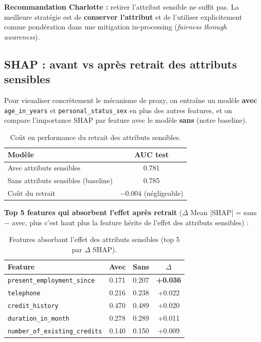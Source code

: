 \documentclass[11pt, a4paper]{article}
\begin{document}
\noindent\textbf{Recommandation Charlotte :} retirer l'attribut sensible ne suffit pas. La meilleure strat\'{e}gie est de \textbf{conserver l'attribut} et de l'utiliser explicitement comme pond\'{e}ration dans une mitigation in-processing (\textit{fairness through awareness}).

\subsection{SHAP : avant vs apr\`{e}s retrait des attributs sensibles}

Pour visualiser concr\`{e}tement le m\'{e}canisme de proxy, on entra\^{i}ne un mod\`{e}le \textbf{avec} \texttt{age\_in\_years} et \texttt{personal\_status\_sex} en plus des autres features, et on compare l'importance SHAP par feature avec le mod\`{e}le \textbf{sans} (notre baseline).

\begin{table}[H]
\centering
\begin{tabular}{lc}
\toprule
\textbf{Mod\`{e}le} & \textbf{AUC test} \\
\midrule
Avec attributs sensibles & 0.781 \\
Sans attributs sensibles (baseline) & 0.785 \\
\midrule
Co\^{u}t du retrait & $-0.004$ (n\'{e}gligeable) \\
\bottomrule
\end{tabular}
\caption{Co\^{u}t en performance du retrait des attributs sensibles.}
\end{table}

\textbf{Top 5 features qui absorbent l'effet apr\`{e}s retrait} ($\Delta$ Mean |SHAP| = sans $-$ avec, plus c'est haut plus la feature \og{} h\'{e}rite \fg{} de l'effet des attributs sensibles) :

\begin{table}[H]
\centering
\begin{tabular}{lccc}
\toprule
\textbf{Feature} & \textbf{Avec} & \textbf{Sans} & \textbf{$\Delta$} \\
\midrule
\texttt{present\_employment\_since}   & 0.171 & 0.207 & \textbf{+0.036} \\
\texttt{telephone}                    & 0.216 & 0.238 & +0.022 \\
\texttt{credit\_history}              & 0.470 & 0.489 & +0.020 \\
\texttt{duration\_in\_month}          & 0.278 & 0.289 & +0.011 \\
\texttt{number\_of\_existing\_credits} & 0.140 & 0.150 & +0.009 \\
\bottomrule
\end{tabular}
\caption{Features absorbant l'effet des attributs sensibles (top 5 par $\Delta$ SHAP).}
\end{table}
\end{document}
